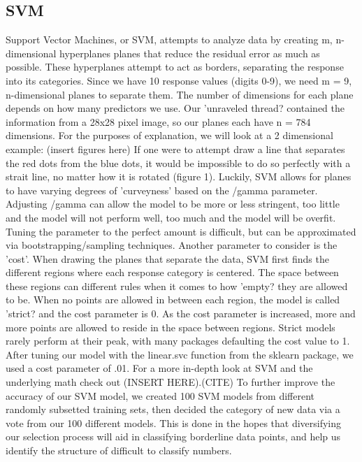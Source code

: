 \documentclass[11pt, oneside]{article}   	%
\begin{document}
\subsection{SVM}
Support Vector Machines, or SVM, attempts to analyze data by creating m, n-dimensional hyperplanes planes that reduce the residual error as much as possible. These hyperplanes attempt to act as borders, separating the response into its categories. Since we have 10 response values (digits 0-9), we need m = 9, n-dimensional planes to separate them. The number of dimensions for each plane depends on how many predictors we use. Our 'unraveled thread? contained the information from a 28x28 pixel image, so our planes each have n = 784 dimensions. For the purposes of explanation, we will look at a 2 dimensional example: (insert figures here) If one were to attempt draw a line that separates the red dots from the blue dots, it would be impossible to do so perfectly with a strait line, no matter how it is rotated (figure 1). Luckily, SVM allows for planes to have varying degrees of 'curveyness' based on the /gamma parameter. Adjusting /gamma can allow the model to be more or less stringent, too little and the model will not perform well, too much and the model will be overfit. Tuning the parameter to the perfect amount is difficult, but can be approximated via bootstrapping/sampling techniques. Another parameter to consider is the 'cost'. When drawing the planes that separate the data, SVM first finds the different regions where each response category is centered. The space between these regions can different rules when it comes to how 'empty? they are allowed to be. When no points are allowed in between each region, the model is called 'strict?  and the cost parameter is 0. As the cost parameter is increased, more and more points are allowed to reside in the space between regions. Strict models rarely perform at their peak, with many packages defaulting the cost value to 1. After tuning our model with the linear.svc function from the sklearn package, we used a cost parameter of .01. For a more in-depth look at SVM and the underlying math check out (INSERT HERE).(CITE)
To further improve the accuracy of our SVM model, we created 100 SVM models from different randomly subsetted training sets, then decided the category of new data via a vote from our 100 different models. This is done in the hopes that diversifying our selection process will aid in classifying borderline data points, and help us identify the structure of difficult to classify numbers.
\end{document}
